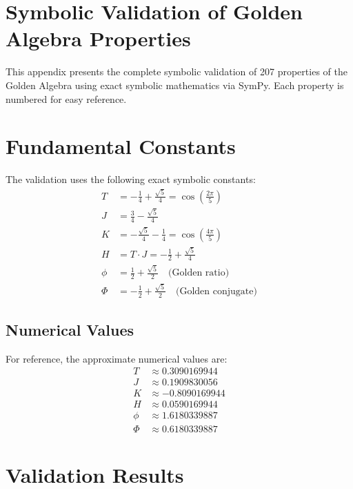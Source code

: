 

\appendix
\section{Symbolic Validation of Golden Algebra Properties}
\label{app:validation}

This appendix presents the complete symbolic validation of 207 properties of the Golden Algebra using exact symbolic mathematics via SymPy. Each property is numbered for easy reference.

\section{Fundamental Constants}
The validation uses the following exact symbolic constants:
\begin{align*}
T &= - \frac{1}{4} + \frac{\sqrt{5}}{4} = \cos\left(\frac{2\pi}{5}\right) \\
J &= \frac{3}{4} - \frac{\sqrt{5}}{4} \\
K &= - \frac{\sqrt{5}}{4} - \frac{1}{4} = \cos\left(\frac{4\pi}{5}\right) \\
H &= T \cdot J = - \frac{1}{2} + \frac{\sqrt{5}}{4} \\
\phi &= \frac{1}{2} + \frac{\sqrt{5}}{2} \quad \text{(Golden ratio)} \\
\Phi &= - \frac{1}{2} + \frac{\sqrt{5}}{2} \quad \text{(Golden conjugate)}
\end{align*}

\subsection{Numerical Values}
For reference, the approximate numerical values are:
\begin{align*}
T &\approx 0.3090169944 \\
J &\approx 0.1909830056 \\
K &\approx -0.8090169944 \\
H &\approx 0.0590169944 \\
\phi &\approx 1.6180339887 \\
\Phi &\approx 0.6180339887
\end{align*}

\section{Validation Results}

